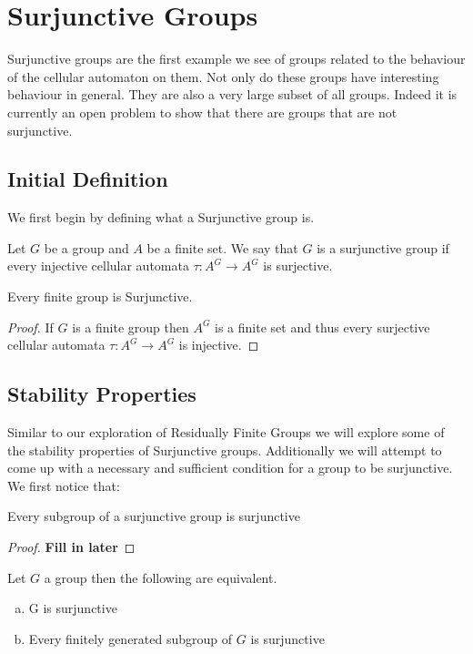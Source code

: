 \section{Surjunctive Groups}%
\label{sec:Surjunctive Groups}

Surjunctive groups are the first example we see of groups related to the behaviour
of the cellular automaton on them. Not only do these groups have interesting 
behaviour in general. They are also a very large subset of all groups. Indeed it is
currently an open problem to show that there are groups that are not surjunctive.

\subsection{Initial Definition}
We first begin by defining what a Surjunctive group is.

\begin{defn}
  Let $G$ be a group and $A$ be a finite set. We say that $G$ is a surjunctive group
  if every injective cellular automata $\tau: A^{G} \to A^{G}$ is surjective.
\end{defn}

\begin{propn}
  Every finite group is Surjunctive.
\end{propn}
\begin{proof}
  If $G$ is a finite group then $A^{G}$ is a finite set and thus every
  surjective cellular automata $\tau: A^{G} \to A^{G}$ is injective.
\end{proof}


\subsection{Stability Properties}
Similar to our exploration of Residually Finite Groups we will explore some of the
stability properties of Surjunctive groups. Additionally we will attempt to come up
with a necessary and sufficient condition for a group to be surjunctive. We first 
notice that:

\begin{propn}
  Every subgroup of a surjunctive group is surjunctive
\end{propn}
\begin{proof}
  \textbf{Fill in later}
\end{proof}

\begin{propn}
  Let $G$ a group then the following are equivalent.
  \begin{enumerate}[(a)]
    \item G is surjunctive
    \item Every finitely generated subgroup of $G$ is surjunctive
  \end{enumerate}
\end{propn}

